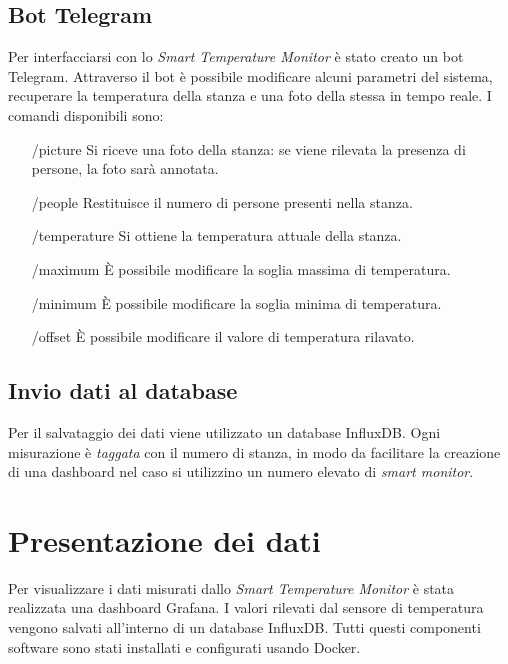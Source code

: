 \documentclass[italian,12pt,a4paper,oneside,final]{report}
\begin{document}
\subsection{Bot Telegram}
Per interfacciarsi con lo \emph{Smart Temperature Monitor} è stato creato un bot Telegram.
Attraverso il bot è possibile modificare alcuni parametri del sistema, recuperare la temperatura della stanza e una foto della stessa in tempo reale.
I comandi disponibili sono:

\begin{itemize}
	\item[/picture] Si riceve una foto della stanza: se viene rilevata la presenza di persone, la foto sarà annotata.
	\item[/people] Restituisce il numero di persone presenti nella stanza.
	\item[/temperature] Si ottiene la temperatura attuale della stanza.
	\item[/maximum] È possibile modificare la soglia massima di temperatura.
	\item[/minimum] È possibile modificare la soglia minima di temperatura.
	\item[/offset] È possibile modificare il valore di temperatura rilavato.
\end{itemize}

\subsection{Invio dati al database}
Per il salvataggio dei dati viene utilizzato un database InfluxDB.
Ogni misurazione è \textit{taggata} con il numero di stanza, in modo da facilitare la creazione di una dashboard nel caso si utilizzino un numero elevato di \emph{smart monitor}.

\newpage
\section{Presentazione dei dati}
Per visualizzare i dati misurati dallo \emph{Smart Temperature Monitor} è stata realizzata una dashboard Grafana.
I valori rilevati dal sensore di temperatura vengono salvati all'interno di un database InfluxDB.
Tutti questi componenti software sono stati installati e configurati usando Docker.
\end{document}
